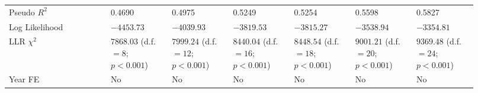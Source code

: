 {\begin{longtable}{p{0.2\linewidth}p{0.12\linewidth}p{0.12\linewidth}p{0.12\linewidth}p{0.12\linewidth}p{0.12\linewidth}p{0.12\linewidth}}
Pseudo $R^2$ & 0.4690 & 0.4975 & 0.5249 & 0.5254 & 0.5598 & 0.5827 \\ 
Log Likelihood & $-4453.73$ & $-4039.93$ & $-3819.53$ & $-3815.27$ & $-3538.94$ & $-3354.81$ \\ 
LLR $\chi^2$  & $7868.03$ (d.f. $= 8$; ${p < 0.001}$) & $7999.24$ (d.f. $= 12$; ${p < 0.001}$) & $8440.04$ (d.f. $= 16$; ${p < 0.001}$) & $8448.54$ (d.f. $= 18$; ${p < 0.001}$) & $9001.21$ (d.f. $= 20$; ${p < 0.001}$) & $9369.48$ (d.f. $= 24$; ${p < 0.001}$) \\ 
Year FE  & No & No & No & No & No & No \\ 
\hline 
\end{longtable} } 
